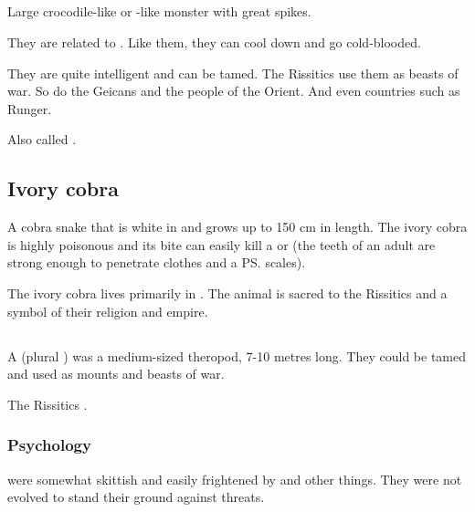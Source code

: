 \subsection{\Mezolisk}
\index{\mezolisk}
Large crocodile-like or \dragon-like monster with great spikes. 

They are related to \ophidians. 
Like them, they can cool down and go cold-blooded. 

They are quite intelligent and can be tamed. 
The Rissitics use them as beasts of war. 
So do the Geicans and the people of the Orient. 
And even countries such as Runger. 

Also called . 















\subsection{Ivory cobra}
A cobra snake that is white in \colour and grows up to 150 cm in length. The ivory cobra is highly poisonous and its bite can easily kill a \human{} or \scatha{} (the teeth of an adult are strong enough to penetrate clothes and a \ps{\scatha} scales). 

The ivory cobra lives primarily in \Durcac. The animal is sacred to the Rissitics and a symbol of their religion and empire. 















\subsection{\Lotha}
\index{\lotha}
A \lotha (plural \emph{\lothae{}}) was a medium-sized theropod, 7-10 metres long.
They could be tamed and used as mounts and beasts of war. 

The Rissitics .





\subsubsection{Psychology}
\Lothae were somewhat skittish and easily frightened by  and other things. 
They were not evolved to stand their ground against threats.















